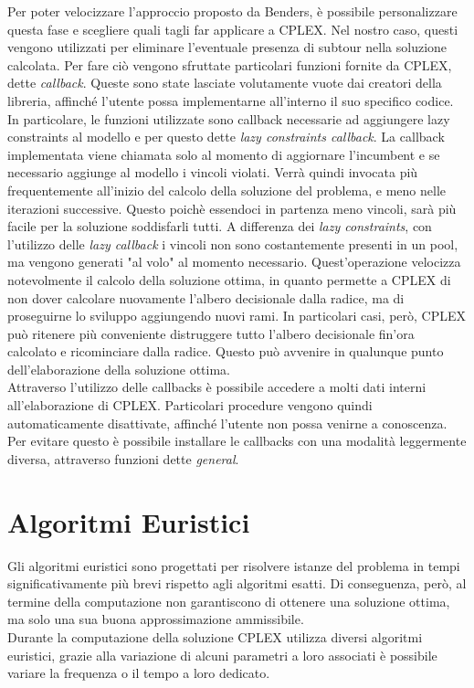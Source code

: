 Per poter velocizzare l'approccio proposto da Benders, è possibile personalizzare questa fase e scegliere quali tagli far applicare a CPLEX. Nel nostro caso, questi vengono utilizzati per eliminare l'eventuale presenza di subtour nella soluzione calcolata. Per fare ciò vengono sfruttate particolari funzioni fornite da CPLEX, dette \textit{callback}. Queste sono state lasciate volutamente vuote dai creatori della libreria, affinché l'utente possa implementarne all'interno il suo specifico codice. In particolare, le funzioni utilizzate sono callback necessarie ad aggiungere lazy constraints al modello e per questo dette \textit{lazy constraints callback}. La callback implementata viene chiamata solo al momento di aggiornare l'incumbent e se necessario aggiunge al modello i vincoli violati. Verrà quindi invocata più frequentemente all'inizio del calcolo della soluzione del problema, e meno nelle iterazioni successive. Questo poichè essendoci in partenza meno vincoli, sarà più facile per la soluzione soddisfarli tutti. A differenza dei \textit{lazy constraints}, con l'utilizzo delle \textit{lazy callback} i vincoli non sono costantemente presenti in un pool, ma vengono generati "al volo" al momento necessario.  Quest'operazione velocizza notevolmente il calcolo della soluzione ottima, in quanto permette a CPLEX di non dover calcolare nuovamente l'albero decisionale dalla radice, ma di proseguirne lo sviluppo aggiungendo nuovi rami. In particolari casi, però, CPLEX può ritenere più conveniente distruggere tutto l'albero decisionale fin'ora calcolato e ricominciare dalla radice. Questo può avvenire in qualunque punto dell'elaborazione della soluzione ottima.\\
Attraverso l'utilizzo delle callbacks è possibile accedere a molti dati interni all'elaborazione di CPLEX. Particolari procedure vengono quindi automaticamente disattivate, affinché l'utente non possa venirne a conoscenza. Per evitare questo è possibile installare le callbacks con una modalità leggermente diversa, attraverso funzioni dette \textit{general}.
\section{Algoritmi Euristici}
Gli algoritmi euristici sono progettati per risolvere istanze del problema in tempi significativamente più brevi rispetto agli algoritmi esatti. Di conseguenza, però, al termine della computazione non garantiscono di ottenere una soluzione ottima, ma solo una sua buona approssimazione ammissibile.\\
Durante la computazione della soluzione CPLEX utilizza diversi algoritmi euristici, grazie alla variazione di alcuni parametri a loro associati è possibile variare la frequenza o il tempo a loro dedicato. 
